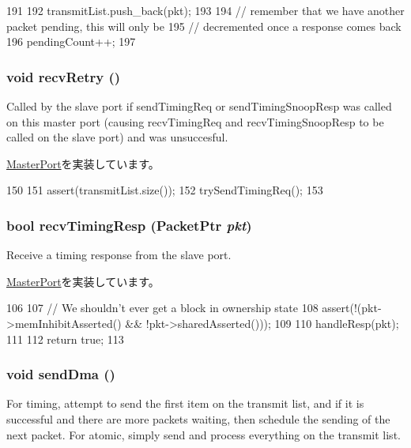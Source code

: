 \begin{DoxyCode}
191 {
192     transmitList.push_back(pkt);
193 
194     // remember that we have another packet pending, this will only be
195     // decremented once a response comes back
196     pendingCount++;
197 }
\end{DoxyCode}
\hypertarget{classDmaPort_a29cb5a4f98063ce6e9210eacbdb35298}{
\subsubsection[{recvRetry}]{\setlength{\rightskip}{0pt plus 5cm}void recvRetry ()}}
\label{classDmaPort_a29cb5a4f98063ce6e9210eacbdb35298}
Called by the slave port if sendTimingReq or sendTimingSnoopResp was called on this master port (causing recvTimingReq and recvTimingSnoopResp to be called on the slave port) and was unsuccesful. 

\hyperlink{classMasterPort_ac1ccc3bcf7ebabb20b57fab99b2be5b0}{MasterPort}を実装しています。


\begin{DoxyCode}
150 {
151     assert(transmitList.size());
152     trySendTimingReq();
153 }
\end{DoxyCode}
\hypertarget{classDmaPort_a482dba5588f4bee43e498875a61e5e0b}{
\subsubsection[{recvTimingResp}]{\setlength{\rightskip}{0pt plus 5cm}bool recvTimingResp ({\bf PacketPtr} {\em pkt})}}
\label{classDmaPort_a482dba5588f4bee43e498875a61e5e0b}
Receive a timing response from the slave port. 

\hyperlink{classMasterPort_abd323548d6c93f8b0543f1fe3a86ca35}{MasterPort}を実装しています。


\begin{DoxyCode}
106 {
107     // We shouldn't ever get a block in ownership state
108     assert(!(pkt->memInhibitAsserted() && !pkt->sharedAsserted()));
109 
110     handleResp(pkt);
111 
112     return true;
113 }
\end{DoxyCode}
\hypertarget{classDmaPort_accc908efe0611b7a131c978f0d1e2e15}{
\subsubsection[{sendDma}]{\setlength{\rightskip}{0pt plus 5cm}void sendDma ()}}
\label{classDmaPort_accc908efe0611b7a131c978f0d1e2e15}
For timing, attempt to send the first item on the transmit list, and if it is successful and there are more packets waiting, then schedule the sending of the next packet. For atomic, simply send and process everything on the transmit list. 



